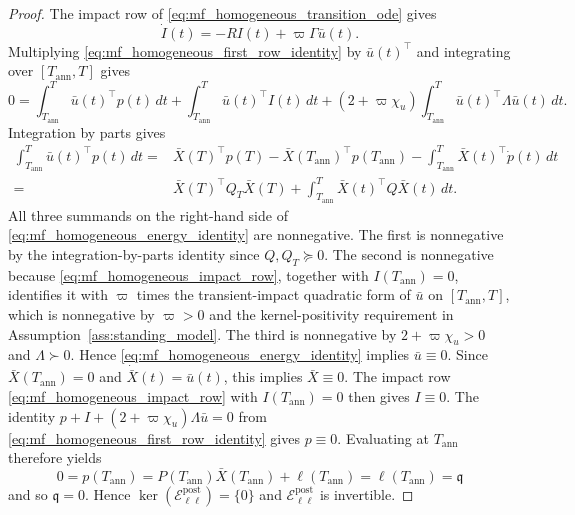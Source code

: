 \documentclass[12pt]{article}
\numberwithin{equation}{section}
\theoremstyle{definition}
\begin{document}
\begin{proof}
The impact row of \eqref{eq:mf_homogeneous_transition_ode} gives
\begin{equation}\label{eq:mf_homogeneous_impact_row}
\dot I(t)=-RI(t)+\varpi\Gamma\bar u(t).
\end{equation}
Multiplying \eqref{eq:mf_homogeneous_first_row_identity} by
\(\bar u(t)^\top\) and
integrating over \([T_{\mathrm{ann}},T]\) gives
\begin{equation}\label{eq:mf_homogeneous_energy_identity}
0
=
\int_{T_{\mathrm{ann}}}^T\bar u(t)^\top p(t)\,dt
+
\int_{T_{\mathrm{ann}}}^T\bar u(t)^\top I(t)\,dt
+
(2+\varpi\chi_u)\int_{T_{\mathrm{ann}}}^T
\bar u(t)^\top\Lambda\bar u(t)\,dt.
\end{equation}
Integration by parts gives
\[
\begin{aligned}
\int_{T_{\mathrm{ann}}}^T\bar u(t)^\top p(t)\,dt
={}&\bar X(T)^\top p(T)
-\bar X(T_{\mathrm{ann}})^\top p(T_{\mathrm{ann}})-\int_{T_{\mathrm{ann}}}^T\bar X(t)^\top\dot p(t)\,dt\\
={}&\bar X(T)^\top Q_T\bar X(T)
+\int_{T_{\mathrm{ann}}}^T\bar X(t)^\top Q\bar X(t)\,dt.
\end{aligned}
\]
All three summands on the right-hand side of
\eqref{eq:mf_homogeneous_energy_identity} are nonnegative. The first is
nonnegative by the integration-by-parts identity since
\(Q,Q_T\succeq0\). The second is nonnegative because
\eqref{eq:mf_homogeneous_impact_row}, together with
\(I(T_{\mathrm{ann}})=0\), identifies it with \(\varpi\) times the transient-impact quadratic
form of \(\bar u\) on \([T_{\mathrm{ann}},T]\), which is nonnegative by
\(\varpi>0\) and the
kernel-positivity requirement in Assumption~\ref{ass:standing_model}. The third
is nonnegative by \(2+\varpi\chi_u>0\) and \(\Lambda\succ0\). Hence
\eqref{eq:mf_homogeneous_energy_identity} implies \(\bar u\equiv0\). Since
\(\bar X(T_{\mathrm{ann}})=0\) and
\(\dot{\bar X}(t)=\bar u(t)\), this implies \(\bar X\equiv0\). The impact row
\eqref{eq:mf_homogeneous_impact_row} with \(I(T_{\mathrm{ann}})=0\) then
gives \(I\equiv0\). The identity \(p+I+(2+\varpi\chi_u)\Lambda\bar u=0\) from
\eqref{eq:mf_homogeneous_first_row_identity} gives
\(p\equiv0\). Evaluating at \(T_{\mathrm{ann}}\) therefore yields
\[
0=p(T_{\mathrm{ann}})
=P(T_{\mathrm{ann}})\bar X(T_{\mathrm{ann}})+\ell(T_{\mathrm{ann}})
=\ell(T_{\mathrm{ann}})=\mathfrak q
\]
and so \(\mathfrak q=0\). Hence
\(\ker(\mathcal E^{\mathrm{post}}_{\ell\ell})=\{0\}\) and
\(\mathcal E^{\mathrm{post}}_{\ell\ell}\) is invertible.


\end{proof}
\end{document}
